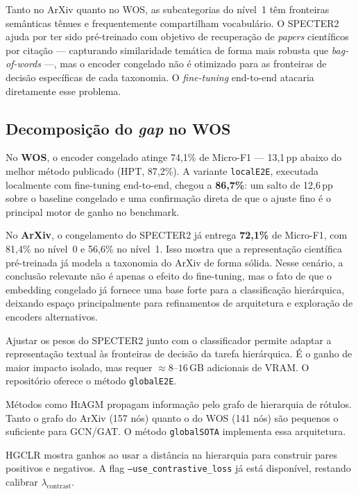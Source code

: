 \documentclass[11pt,a4paper,twoside]{article}
\begin{document}
Tanto no ArXiv quanto no WOS, as subcategorias do nível~1 têm fronteiras
semânticas tênues e frequentemente compartilham vocabulário. O
\textsc{SPECTER2} ajuda por ter sido pré-treinado com objetivo de recuperação
de \textit{papers} científicos por citação --- capturando similaridade temática
de forma mais robusta que \textit{bag-of-words} ---, mas o encoder congelado não
é otimizado para as fronteiras de decisão específicas de cada taxonomia. O
\textit{fine-tuning} end-to-end atacaria diretamente esse problema.

\subsection{Decomposição do \textit{gap} no WOS}

No \textbf{WOS}, o encoder congelado atinge 74,1\% de Micro-F1 --- 13,1\,pp abaixo do
melhor método publicado (HPT, 87,2\%). A variante \texttt{localE2E}, executada
localmente com fine-tuning end-to-end, chegou a \textbf{86,7\%}: um salto de
12,6\,pp sobre o baseline congelado e uma confirmação direta de que o ajuste fino
é o principal motor de ganho no benchmark.

No \textbf{ArXiv}, o congelamento do SPECTER2 já entrega \textbf{72,1\%} de
Micro-F1, com 81,4\% no nível~0 e 56,6\% no nível~1. Isso mostra que a
representação científica pré-treinada já modela a taxonomia do ArXiv de forma
sólida. Nesse cenário, a conclusão relevante não é apenas o efeito do
fine-tuning, mas o fato de que o embedding congelado já fornece uma base forte
para a classificação hierárquica, deixando espaço principalmente para
refinamentos de arquitetura e exploração de encoders alternativos.

\begin{description}[leftmargin=*, itemsep=4pt, font=\bfseries]

  \item[Fine-tuning end-to-end (est.\ +5\,pp).]
  Ajustar os pesos do \textsc{SPECTER2} junto com o classificador permite
  adaptar a representação textual às fronteiras de decisão da tarefa hierárquica.
  É o ganho de maior impacto isolado, mas requer $\approx 8$--$16$\,GB adicionais
  de VRAM. O repositório oferece o método \texttt{globalE2E}.

  \item[Label-graph GNN (est.\ +4--6\,pp).]
  Métodos como \textsc{HiAGM} \cite{zhou2020hiagm} propagam informação pelo
  grafo de hierarquia de rótulos. Tanto o grafo do ArXiv (157 nós) quanto o do
  WOS (141 nós) são pequenos o suficiente para GCN/GAT. O método
  \texttt{globalSOTA} implementa essa arquitetura.

  \item[Perda contrastiva hierárquica (est.\ +2--4\,pp).]
  \textsc{HGCLR} \cite{wang2022hgclr} mostra ganhos ao usar a distância na
  hierarquia para construir pares positivos e negativos. A flag
  \texttt{--use\_contrastive\_loss} já está disponível, restando calibrar
  $\lambda_{\text{contrast}}$.

\end{description}
\end{document}
